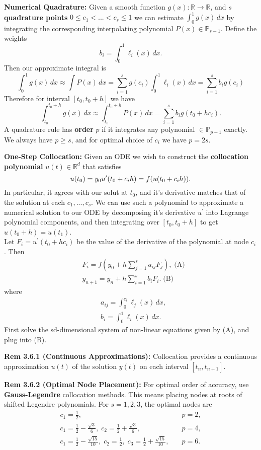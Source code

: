 \documentclass[10pt,a4paper]{article}
\newcommand{\R}{\mathbb{R}}
\renewcommand{\P}{\mathbb{P}}
\begin{document}
\begin{multicols*}{2}
\textbf{Numerical Quadrature:} Given a smooth function $g(x) : \R \to \R$, and $s$ \textbf{quadrature points} $0 \leq c_1 < ... < c_s \leq 1$ we can estimate $\int_0^1 g(x) \,dx$ by integrating the corresponding interpolating polynomial $P(x) \in \P_{s - 1}$. Define the weights \[
b_i = \int_0^1 \ell_i(x)\,dx.    
\]
Then our approximate integral is
\[
\int_0^1 g(x)\,dx \approx \int P(x)\,dx = \sum_{i=1}^s g(c_i) \int_0^1\ell_i(x)\,dx = \sum_{i=1}^s b_i g(c_i)
\]
Therefore for interval $[t_0, t_0 + h]$ we have
\[
    \int_{t_0}^{t_0 + h} g(x)\,dx \approx \int_{t_0}^{t_0 + h} P(x) \, dx = \sum_{i=1}^s b_i g(t_0 + hc_i).
\]
A quadrature rule has \textbf{order} $p$ if it integrates any polynomial $\in \P_{p-1}$ exactly. We always have $p \geq s$, and for optimal choice of $c_i$ we have $p = 2s$.

\textbf{One-Step Collocation:} Given an ODE we wish to construct the \textbf{collocation polynomial} $u(t) \in \R^d$ that satisfies 
\begin{equation*}
    u(t_0) = y_0\\
    u^\prime(t_0 + c_ih) = f(u(t_0 + c_i h)).
\end{equation*}
In particular, it agrees with our solut at $t_0$, and it's derivative matches that of the solution at each $c_1,...,c_s$. We can use such a polynomial to approximate a numerical solution to our ODE by decomposing it's derivative $u^\prime$ into Lagrange polynomial components, and then integrating over $[t_0, t_0 + h]$ to get $u(t_0 + h) = u(t_1)$.\\
Let $F_i = u^\prime(t_0 + hc_i)$ be the value of the derivative of the polynomial at node $c_i$. Then 
\begin{align*}
    & F_i = f(y_0 + h\sum_{j = 1}^s a_{ij}F_j), \; \text{(A)}\\
    & y_{n+1} = y_n + h\sum_{i = 1}^s b_i F_i. \; \text{(B)}
\end{align*} 
where 
\begin{align*}
    & a_{ij} = \int_0^{c_i}\ell_j(x)\,dx,\\
    & b_i = \int_0^1\ell_i(x)\,dx.
\end{align*}
First solve the sd-dimensional system of non-linear equations given by (A), and plug into (B).

\textbf{Rem 3.6.1 (Continuous Approximations):} Collocation provides a continuous approximation $u(t)$ of the solution $y(t)$ on each interval $[t_n, t_{n+1}]$.

\textbf{Rem 3.6.2 (Optimal Node Placement):} For optimal order of accuracy, use \textbf{Gauss-Legendre} collocation methods. This means placing nodes at roots of shifted Legendre polynomials. For $s = 1, 2, 3$, the optimal nodes are \begin{align*}
    c_1 = \frac{1}{2}, \quad &p = 2, \\
    c_1 = \frac{1}{2} - \frac{\sqrt{3}}{6},\; c_2 = \frac{1}{2} + \frac{\sqrt{3}}{6}, \quad &p = 4, \\
    c_1 = \frac{1}{2} - \frac{\sqrt{15}}{10},\; c_2 = \frac{1}{2} ,\; c_3 =\frac{1}{2} + \frac{\sqrt{15}}{10}, \quad &p = 6.
\end{align*}\\


\end{multicols*}
\end{document}
